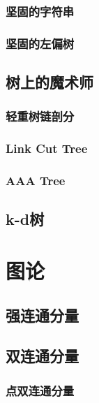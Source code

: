 \documentclass[a4paper]{article}
\newcommand{\cppcode}[1]{
    \inputminted[mathescape]{cpp}{source/#1}
}
\begin{document}

\subsubsection{坚固的字符串}

\subsubsection{坚固的左偏树}

\subsection{树上的魔术师}

\subsubsection{轻重树链剖分}


\subsubsection{Link Cut Tree}

\subsubsection{AAA Tree}

\subsection{k-d树}

\section{图论}

\subsection{强连通分量}


\subsection{双连通分量}

\subsubsection{点双连通分量}
\end{document}

